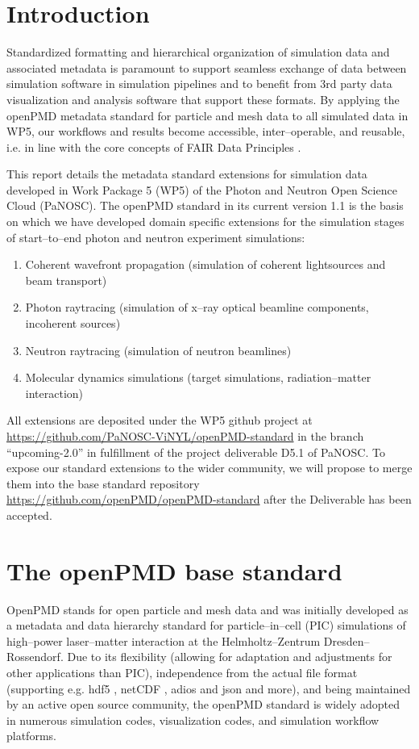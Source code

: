 \documentclass[11pt, a4paper]{article}
\begin{document}
\tableofcontents
\newpage

\section{Introduction}
Standardized formatting and hierarchical organization of simulation data and associated metadata is paramount to support seamless
exchange of data between simulation software in simulation pipelines and to benefit from 3rd party data visualization
and analysis software that support these formats. By applying the openPMD metadata standard for particle and mesh data \cite{Huebl2015} to all simulated data in
WP5, our workflows and results become accessible, inter--operable, and reusable, i.e. in line with the core concepts of
FAIR Data Principles \cite{Wilkinson2016}.

This report details the metadata standard extensions for simulation data developed in Work Package 5 (WP5) of the Photon
and Neutron Open Science Cloud (PaNOSC). The openPMD standard in its current version 1.1 is the basis on which we have
developed domain specific extensions for the simulation stages of start--to--end photon and neutron experiment
simulations:
\begin{enumerate}
  \item Coherent wavefront propagation (simulation of coherent lightsources and beam transport)
  \item Photon raytracing (simulation of x--ray optical beamline components, incoherent sources)
  \item Neutron raytracing (simulation of neutron beamlines)
  \item Molecular dynamics simulations (target simulations, radiation--matter interaction)
\end{enumerate}

All extensions are deposited under the WP5 github project at \url{https://github.com/PaNOSC-ViNYL/openPMD-standard} in
the branch ``upcoming-2.0'' in fulfillment of the project deliverable D5.1 of PaNOSC. To expose our standard extensions
to the wider community, we will propose to merge them into the base standard repository
\url{https://github.com/openPMD/openPMD-standard} after the Deliverable has been accepted.

\section{The openPMD base standard}
OpenPMD stands for open particle and mesh data and was initially developed as a metadata and data hierarchy standard for
particle--in--cell (PIC) simulations of high--power laser--matter interaction at the Helmholtz--Zentrum Dresden--Rossendorf.
Due to its flexibility (allowing for adaptation and adjustments for other applications than PIC), independence from the
actual file format (supporting e.g. hdf5 \cite{HDFGroup1997}, netCDF \cite{Rew1989}, adios \cite{Liu2014} and json
\cite{json2019} and
more), and being maintained by an active open source community, the openPMD standard is widely adopted in numerous
simulation codes, visualization codes, and simulation workflow platforms.
\end{document}
